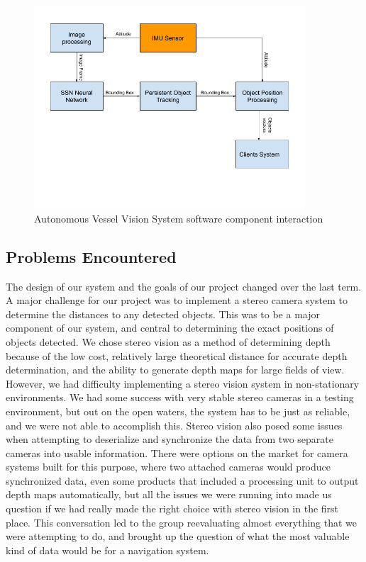 \documentclass[onecolumn, draftclsnofoot,10pt, compsoc]{IEEEtran}
\begin{document}
\begin{figure}[H]
\centering
\includegraphics[width=0.9\textwidth]{./Planz.png}
\caption{Autonomous Vessel Vision System software component interaction}
\label{fig:componentDiagram}
\end{figure}

\subsection{Problems Encountered}
The design of our system and the goals of our project changed over the last term. 
A major challenge for our project was to implement a stereo camera system to determine the distances to any detected objects. This was to be a major component of our system, and central to determining the exact positions of objects detected. We chose stereo vision as a method of determining depth because of the low cost, relatively large theoretical distance for accurate depth determination, and the ability to generate depth maps for large fields of view. However, we had difficulty implementing a stereo vision system in non-stationary environments. We had some success with very stable stereo cameras in a testing environment, but out on the open waters, the system has to be just as reliable, and we were not able to accomplish this. Stereo vision also posed some issues when attempting to deserialize and synchronize the data from two separate cameras into usable information. There were options on the market for camera systems built for this purpose, where two attached cameras would produce synchronized data, even some products that included a processing unit to output depth maps automatically, but all the issues we were running into made us question if we had really made the right choice with stereo vision in the first place. This conversation led to the group reevaluating almost everything that we were attempting to do, and brought up the question of what the most valuable kind of data would be for a navigation system.
\end{document}

